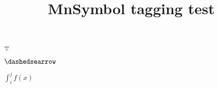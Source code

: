 \documentclass{article}
\title{MnSymbol tagging test}
\begin{document}
\circledR

\circledS

\yen

\dagger

\ddagger

\mathparagraph

\mathsection

\mathdollar

\mathsterling

$\doublebarwedge$

$\dashedsearrow$

$\int_i^j f(x)$
\end{document}
